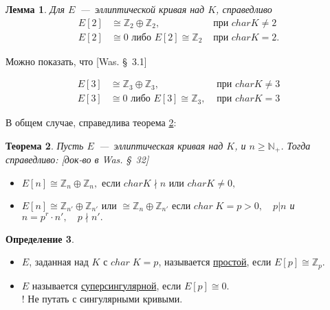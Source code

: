 \documentclass[12pt]{article}
\newcommand{\N}{{{\mathbb N}}}
\newcommand{\Z}{{{\mathbb Z}}}
\newtheorem{theorem}{Теорема}
\newtheorem{lemma}[theorem]{Лемма}
\theoremstyle{definition}
\newtheorem{definition}[theorem]{Определение}
\theoremstyle{definition}
\theoremstyle{definition}
\begin{document}
\begin{lemma}
	\label{lemm_01}
	Для $E$~---~эллиптической кривая над $K$, справедливо
	\begin{align*}
	E\left[ 2 \right] &\cong {\Z_2} \oplus {\Z_2}, &\text{ при }charK \ne 2 \\
	E\left[ 2 \right] &\cong 0 \text{ либо } E\left[ 2 \right] \cong {\Z_2} & \text{ при } char K = 2.
	\end{align*}

\end{lemma}

Можно показать, что [Was. \S~3.1]

\begin{align*}
E\left[ 3 \right] &\cong {\Z_3} \oplus {\Z_3}, & {\text{ при }}char K \ne 3 \\
E\left[ 3 \right] &\cong 0 \text{ либо } E\left[ 3 \right] \cong \Z_3, & {\text{ при }} char K = 3
\end{align*}

В общем случае, справедлива теорема \ref{theor_02}:

\begin{theorem}
	\label{theor_02}
	Пусть $E$~---~эллиптическая кривая над $K$, и $n \geqslant {\N_+}$. Тогда справедливо: [док-во в Was. \S~32]
	\begin{itemize}
		\item $E\left[ n \right] \cong {\Z_n} \oplus {\Z_n},{\text{ если }} char K \nmid n{\text{ или }}char K \ne 0,$
		
		\item $E\left[ n \right] \cong {\Z_{n'}} \oplus {\Z_{n'}}{\text{ или }} \cong {\Z_n} \oplus {\Z_{n'}}{\text{ если }}char\;K = p > 0,\quad p|n$
		и $n = p^r \cdot n',\quad p \nmid n'.$
	\end{itemize}
\end{theorem}

\begin{definition}
	\label{def_03}
	$ $
	\begin{itemize}
	\item $E$, заданная над $K$ с $char\;K = p$, называется \underline{простой}, если $E[p] \cong {\Z_p}$.

	\item $E$ называется \underline{суперсингулярной}, если $E[p] \cong 0$.\\
	! Не путать с сингулярными кривыми.
	\end{itemize}
\end{definition}
\end{document}
